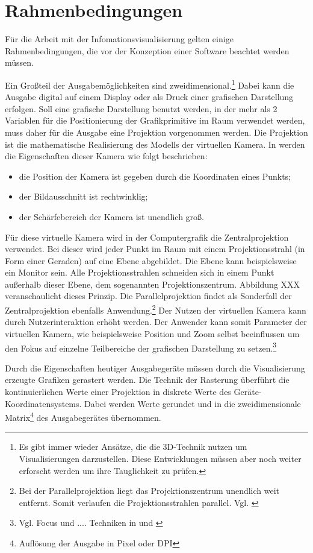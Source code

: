 \documentclass[a4paper, 12pt, DIVcalc, onepage, pdftex, headsepline, footsepline]{scrreprt}
\begin{document}
\section{Rahmenbedingungen}
Für die Arbeit mit der Infomationsvisualisierung gelten einige Rahmenbedingungen, die vor der
Konzeption einer Software beachtet werden müssen.

Ein Großteil der Ausgabemöglichkeiten sind zweidimensional.\footnote{Es gibt immer wieder
Ansätze, die die 3D-Technik nutzen um Visualisierungen darzustellen. Diese Entwicklungen
müssen aber noch weiter erforscht werden um ihre Tauglichkeit zu prüfen.} Dabei kann
die Ausgabe digital auf einem Display oder als Druck einer grafischen Darstellung
erfolgen. Soll eine grafische Darstellung benutzt werden, in der mehr als 2 Variablen
für die Positionierung der Grafikprimitive im Raum verwendet werden, muss daher für die
Ausgabe eine Projektion vorgenommen werden. Die Projektion ist die mathematische
Realisierung des Modells der virtuellen Kamera. In \citep[S.\,26]{Computergrafik} werden die 
Eigenschaften dieser Kamera wie folgt beschrieben:
\begin{itemize}
\item die Position der Kamera ist gegeben durch die Koordinaten eines Punkts;
\item der Bildausschnitt ist rechtwinklig;
\item der Schärfebereich der Kamera ist unendlich groß.
\end{itemize}
Für diese virtuelle Kamera wird in der Computergrafik die Zentralprojektion verwendet.
Bei dieser wird jeder Punkt im Raum mit einem Projektionsstrahl (in Form einer Geraden)
auf eine Ebene abgebildet. Die Ebene kann beispielsweise ein Monitor sein. Alle 
Projektionsstrahlen schneiden sich in einem Punkt außerhalb dieser Ebene, dem sogenannten
Projektionszentrum. Abbildung XXX veranschaulicht dieses Prinzip. Die Parallelprojektion
findet als Sonderfall der Zentralprojektion ebenfalls Anwendung.\footnote{Bei der
Parallelprojektion liegt das Projektionszentrum unendlich weit entfernt. Somit verlaufen
die Projektionsstrahlen parallel. Vgl. \citep{wiki_projektion}} Der Nutzen der virtuellen
Kamera kann durch Nutzerinteraktion erhöht werden. Der Anwender kann somit Parameter der
virtuellen Kamera, wie beispielsweise Position und Zoom selbst beeinflussen um den Fokus
auf einzelne Teilbereiche der grafischen Darstellung zu setzen.\footnote{Vgl. Focus und
.... Techniken in \citep[S.\,1]{Schumann} und \citep[S.\,1]{Preim}}

Durch die Eigenschaften heutiger Ausgabegeräte müssen durch die Visualisierung erzeugte
Grafiken gerastert werden. Die Technik der Rasterung überführt die kontinuierlichen Werte
einer Projektion in diskrete Werte des Geräte-Koordinatensystems. Dabei werden Werte
gerundet und in die zweidimensionale Matrix\footnote{Auflösung der Ausgabe in Pixel oder DPI}
des Ausgabegerätes übernommen.
\end{document}
